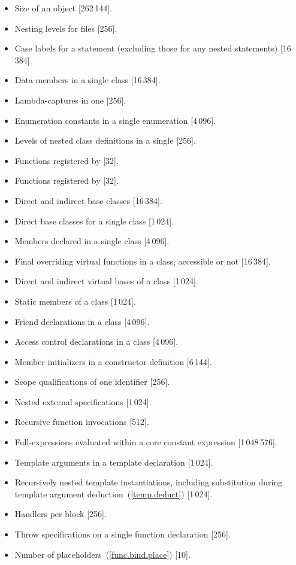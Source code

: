 \begin{paras}
\begin{itemize}
\item%
Size of an object [262\,144].
\item%
Nesting levels for
files [256].
\item%
Case labels for a
statement (excluding those for any nested
statements)
[16\,384].
\item%
Data members in a single class [16\,384].
\item%
Lambda-captures in one  [256].
\item%
Enumeration constants in a single enumeration [4\,096].
\item%
Levels of nested class definitions
in a single
[256].
\item%
Functions registered by
 [32].
\item%
Functions registered by
 [32].
\item%
Direct and indirect base classes [16\,384].
\item%
Direct base classes for a single class [1\,024].
\item%
Members declared in a single class [4\,096].
\item%
Final overriding virtual functions in a class,
accessible or not [16\,384].
\item%
Direct and indirect virtual bases of a class [1\,024].
\item%
Static members of a class [1\,024].
\item%
Friend declarations in a class [4\,096].
\item%
Access control declarations in a class [4\,096].
\item%
Member initializers in a constructor definition [6\,144].
\item%
Scope qualifications of one identifier [256].
\item%
Nested external specifications [1\,024].
\item%
Recursive  function invocations [512].
\item%
Full-expressions evaluated within a core constant expression [1\,048\,576].
\item%
Template arguments in a template declaration [1\,024].
\item%
Recursively nested template instantiations, including substitution
during template argument deduction~(\ref{temp.deduct}) [1\,024].
\item%
Handlers per
block [256].
\item%
Throw specifications on a single function declaration [256].

\item%
Number of placeholders~(\ref{func.bind.place}) [10].

\end{itemize}

\end{paras}
